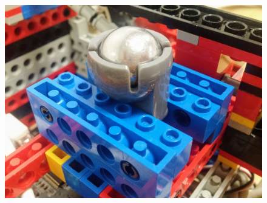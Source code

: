 \begin{figure}[ht]
    \centering
    \includegraphics[width=0.7\linewidth]{res/robot-pics/ball-caster-wheel.jpg}
    \caption{}
    \label{fig:}
\end{figure}
